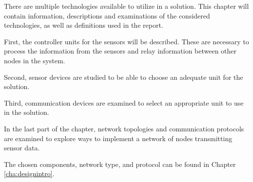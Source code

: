 \label{cha:technologies}
There are multiple technologies available to utilize in a solution. This chapter will contain information, descriptions and examinations of the considered technologies, as well as definitions used in the report.

First, the controller units for the sensors will be described. These are necessary to process the information from the sensors and relay information between other nodes in the system.

Second, sensor devices are studied to be able to choose an adequate unit for the solution.

Third, communication devices are examined to select an appropriate unit to use in the solution. 

In the last part of the chapter, network topologies and communication protocols are examined to explore ways to implement a network of nodes transmitting sensor data.

The chosen components, network type, and protocol can be found in Chapter \ref{cha:designintro}.








